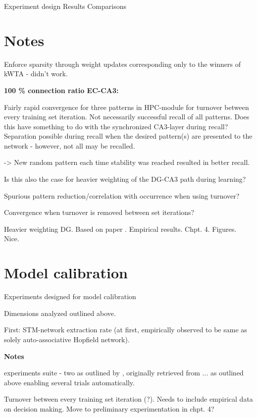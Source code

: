 Experiment design
Results
Comparisons

\section*{Notes}

Enforce sparsity through weight updates corresponding only to the winners of kWTA - didn't work.

\textbf{100 \% connection ratio EC-CA3:}

Fairly rapid convergence for three patterns in HPC-module for turnover between every training set iteration. 
Not necessarily successful recall of all patterns. Does this have something to do with the synchronized CA3-layer during recall? Separation possible during recall when the desired pattern(s) are presented to the network - however, not all may be recalled.

-> New random pattern each time stability was reached resulted in better recall.

Is this also the case for heavier weighting of the DG-CA3 path during learning?

Spurious pattern reduction/correlation with occurrence when using turnover?

Convergence when turnover is removed between set iterations?

Heavier weighting DG. Based on paper \citep{Norman2003}. Empirical results. Chpt. 4. Figures. Nice.

\section*{Model calibration}

Experiments designed for model calibration

Dimensions analyzed outlined above.

First: STM-network extraction rate (at first, empirically observed to be same as solely auto-associative Hopfield network).


\textbf{Notes}

experiments suite - two as outlined by \citep{Hattori2014}, originally retrieved from ... as outlined above
enabling several trials automatically.

Turnover between every training set iteration (?). Needs to include empirical data on decision making. Move to preliminary experimentation in chpt. 4?

\cleardoublepage